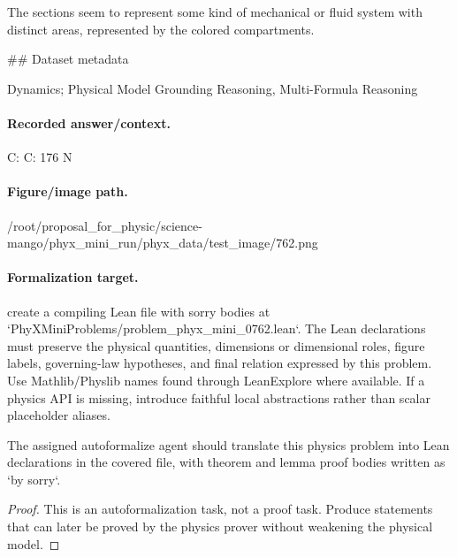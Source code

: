 The sections seem to represent some kind of mechanical or fluid system with distinct areas, represented by the colored compartments.

\#\# Dataset metadata

Dynamics; Physical Model Grounding Reasoning, Multi-Formula Reasoning

\paragraph{Recorded answer/context.}
C: C: 176 N

\paragraph{Figure/image path.}
/root/proposal\_for\_physic/science-mango/phyx\_mini\_run/phyx\_data/test\_image/762.png

\paragraph{Formalization target.}
create a compiling Lean file with sorry bodies at `PhyXMiniProblems/problem\_phyx\_mini\_0762.lean`. The Lean declarations must preserve the physical quantities, dimensions or dimensional roles, figure labels, governing-law hypotheses, and final relation expressed by this problem.
Use Mathlib/Physlib names found through LeanExplore where available. If a physics API is missing, introduce faithful local abstractions rather than scalar placeholder aliases.

\begin{theorem}
\label{thm:physics:phyx_mini_0762:target}
The assigned autoformalize agent should translate this physics problem into Lean declarations in the covered file, with theorem and lemma proof bodies written as `by sorry`.
\end{theorem}
\begin{proof}
This is an autoformalization task, not a proof task. Produce statements that can later be proved by the physics prover without weakening the physical model.
\end{proof}

